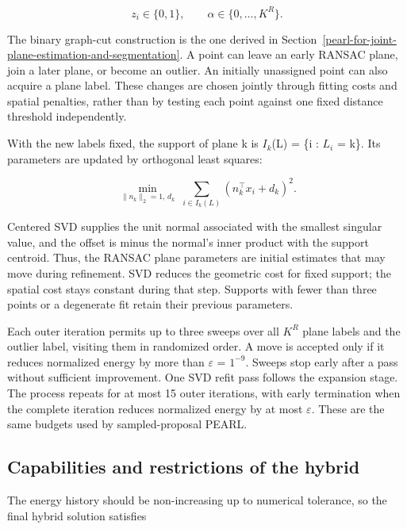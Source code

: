 \begin{equation}
z_i\in\{0,1\},\qquad\alpha\in\{0,\ldots,K^R\}.
\label{eq:52}
\end{equation}

The binary graph-cut construction is the one derived in Section~\ref{pearl-for-joint-plane-estimation-and-segmentation}. A point can leave an early RANSAC plane, join a later plane, or become an outlier. An initially unassigned point can also acquire a plane label. These changes are chosen jointly through fitting costs and spatial penalties, rather than by testing each point against one fixed distance threshold independently.

With the new labels fixed, the support of plane k is \(I_{k}\)(L) = \{i : \(L_{i}\) = k\}. Its parameters are updated by orthogonal least squares:

\begin{equation}
\min_{\|n_k\|_2=1,\,d_k}\;\sum_{i\in I_k(L)}(n_k^\top x_i+d_k)^2.
\label{eq:53}
\end{equation}

Centered SVD supplies the unit normal associated with the smallest singular value, and the offset is minus the normal's inner product with the support centroid. Thus, the RANSAC plane parameters are initial estimates that may move during refinement. SVD reduces the geometric cost for fixed support; the spatial cost stays constant during that step. Supports with fewer than three points or a degenerate fit retain their previous parameters.

Each outer iteration permits up to three sweeps over all \(K^{R}\) plane labels and the outlier label, visiting them in randomized order. A move is accepted only if it reduces normalized energy by more than \(\varepsilon\) = \(1^{-9}\). Sweeps stop early after a pass without sufficient improvement. One SVD refit pass follows the expansion stage. The process repeats for at most 15 outer iterations, with early termination when the complete iteration reduces normalized energy by at most \(\varepsilon\). These are the same budgets used by sampled-proposal PEARL.

\subsection{Capabilities and restrictions of the hybrid}\label{capabilities-and-restrictions-of-the-hybrid}

The energy history should be non-increasing up to numerical tolerance, so the final hybrid solution satisfies

